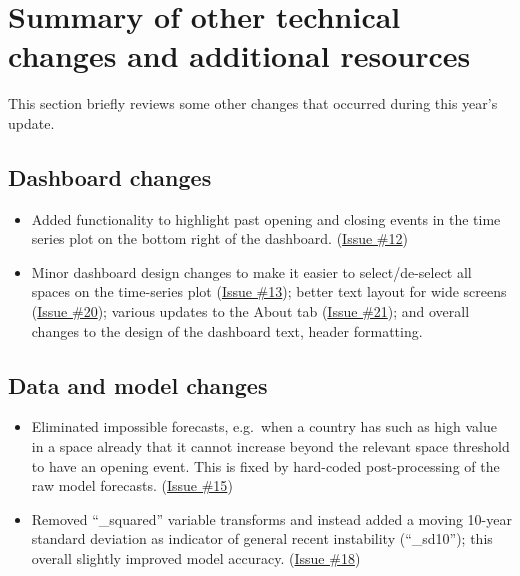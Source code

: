 \documentclass[
  11pt,
]{article}
\providecommand{\tightlist}{%
  \setlength{\itemsep}{0pt}\setlength{\parskip}{0pt}}
\begin{document}
\hypertarget{summary-of-other-technical-changes-and-additional-resources}{%
\section{Summary of other technical changes and additional
resources}\label{summary-of-other-technical-changes-and-additional-resources}}

This section briefly reviews some other changes that occurred during
this year's update.

\hypertarget{dashboard-changes}{%
\subsection{Dashboard changes}\label{dashboard-changes}}

\begin{itemize}
\tightlist
\item
  Added functionality to highlight past opening and closing events in
  the time series plot on the bottom right of the dashboard.
  (\href{https://github.com/vdeminstitute/demspaces/issues/12}{Issue
  \#12})
\item
  Minor dashboard design changes to make it easier to select/de-select
  all spaces on the time-series plot
  (\href{https://github.com/vdeminstitute/demspaces/issues/13}{Issue
  \#13}); better text layout for wide screens
  (\href{https://github.com/vdeminstitute/demspaces/issues/20}{Issue
  \#20}); various updates to the About tab
  (\href{https://github.com/vdeminstitute/demspaces/issues/21}{Issue
  \#21}); and overall changes to the design of the dashboard text,
  header formatting.
\end{itemize}

\hypertarget{data-and-model-changes}{%
\subsection{Data and model changes}\label{data-and-model-changes}}

\begin{itemize}
\tightlist
\item
  Eliminated impossible forecasts, e.g.~when a country has such as high
  value in a space already that it cannot increase beyond the relevant
  space threshold to have an opening event. This is fixed by hard-coded
  post-processing of the raw model forecasts.
  (\href{https://github.com/vdeminstitute/demspaces/issues/15}{Issue
  \#15})
\item
  Removed ``\_squared'' variable transforms and instead added a moving
  10-year standard deviation as indicator of general recent instability
  (``\_sd10''); this overall slightly improved model accuracy.
  (\href{https://github.com/vdeminstitute/demspaces/issues/18}{Issue
  \#18})
\end{itemize}
\end{document}
